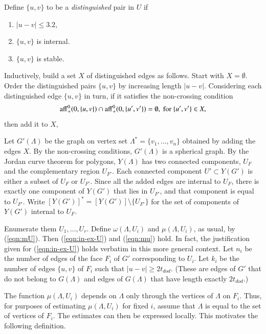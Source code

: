 \documentclass{article} %
\begin{document}
Define $\{u,v\}$ to be a {\it distinguished} pair in $U$ if
\begin{enumerate}
\item  $|u-v|\le3.2$, 
\item $\{u,v\}$ is internal.
\item  $\{u,v\}$ is stable.
\end{enumerate}  

Inductively, build a set $X$ of distinguished edges as follows.
Start with $X=\emptyset$.
Order the distinguished pairs $\{u,v\}$ by increasing
length $|u-v|$.  Considering each
distinguished edge $\{u,v\}$ in turn,
if it satisfies
the non-crossing condition
  $$
  {\operatorname{aff}}_+^0(0,\{u,v\}) \cap {\operatorname{aff}}_+^0(0,\{u',v'\}) = \emptyset,
  \text{ for } \{u',v'\}\in X,
$$
then add it to $X$, 



Let $G'(\Lambda)$ be the graph on vertex set $\Lambda^*=\{v_1,\ldots,v_n\}$ obtained by adding the edges $X$.  By the non-crossing
conditions, $G'(\Lambda)$ is a spherical graph.  
By the Jordan curve theorem for polygons, $Y(\Lambda)$ has two connected 
components,
$U_F$ and the complementary region $U_{F'}$.
Each
connected component $U'\subset Y(G')$ is either a subset of $U_F$ or $U_{F'}$.
Since all the added edges are internal to $U_F$, there is exactly
one component of $Y(G')$ that lies in $U_{F'}$, and that component
is equal to $U_{F'}$.  Write $[Y(G')]^* = [Y(G')]\setminus\{U_{F'}\}$
for the set of components of $Y(G')$ internal to $U_F$.

Enumerate them $U_1,\ldots,U_r$.  Define $\omega(\Lambda,U_i)$ and
$\mu(\Lambda,U_i)$, as usual,  by (\ref{eqn:mU}).  Then
(\ref{eqn:in-ex-U}) and (\ref{eqn:mu}) hold.  In fact, the justification
given for (\ref{eqn:in-ex-U}) holds verbatim in this more general
context. Let $n_i$ be the number of edges of the face
$F_i$ of $G'$ corresponding to $U_i$.  Let $k_i$ be the number of edges
$\{u,v\}$
of $F_i$ such that $|u-v|\ge 2t_{dod}$. (These are edges of $G'$ that do not
belong to $G(\Lambda)$ and edges of $G(\Lambda)$ that have
length exactly $2t_{dod}$.)  

The function $\mu(\Lambda,U_i)$ depends on $\Lambda$ only through
the vertices of $\Lambda$ on $F_i$.  Thus, for purposes of estimating
$\mu(\Lambda,U_i)$ for fixed $i$,  assume that $\Lambda$
is equal to the set of vertices of $F_i$.  The estimates can then
be expressed locally.
   This motivates the following definition.
\end{document}
